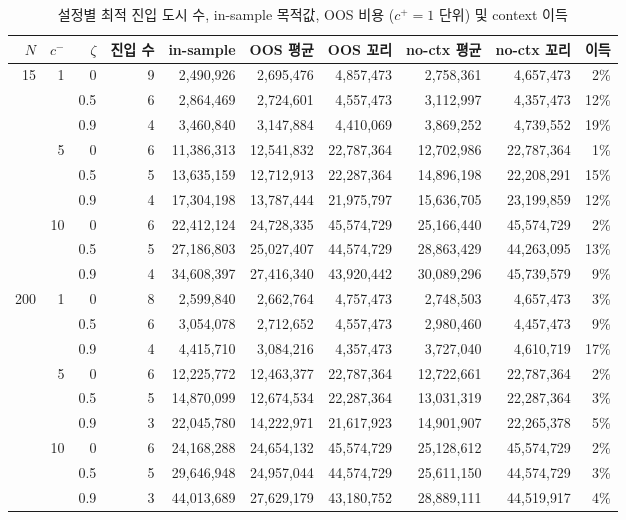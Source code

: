 \documentclass[10pt,a4paper]{article}
\begin{document}
\begin{table}[H]\centering\footnotesize
\caption{설정별 최적 진입 도시 수, in-sample 목적값, OOS 비용 ($c^+=1$ 단위) 및 context 이득}\label{tab:main}
\begin{tabular}{@{}rrr r rrr rr r@{}}
\toprule
$N$ & $c^-$ & $\zeta$ & 진입 수 & in-sample & OOS 평균 & OOS 꼬리 & no-ctx 평균 & no-ctx 꼬리 & 이득 \\ \midrule
15  & 1  & 0   & 9 & 2{,}490{,}926 & 2{,}695{,}476 & 4{,}857{,}473 & 2{,}758{,}361 & 4{,}657{,}473 & 2\% \\
    &    & 0.5 & 6 & 2{,}864{,}469 & 2{,}724{,}601 & 4{,}557{,}473 & 3{,}112{,}997 & 4{,}357{,}473 & 12\% \\
    &    & 0.9 & 4 & 3{,}460{,}840 & 3{,}147{,}884 & 4{,}410{,}069 & 3{,}869{,}252 & 4{,}739{,}552 & 19\% \\
    & 5  & 0   & 6 & 11{,}386{,}313 & 12{,}541{,}832 & 22{,}787{,}364 & 12{,}702{,}986 & 22{,}787{,}364 & 1\% \\
    &    & 0.5 & 5 & 13{,}635{,}159 & 12{,}712{,}913 & 22{,}287{,}364 & 14{,}896{,}198 & 22{,}208{,}291 & 15\% \\
    &    & 0.9 & 4 & 17{,}304{,}198 & 13{,}787{,}444 & 21{,}975{,}797 & 15{,}636{,}705 & 23{,}199{,}859 & 12\% \\
    & 10 & 0   & 6 & 22{,}412{,}124 & 24{,}728{,}335 & 45{,}574{,}729 & 25{,}166{,}440 & 45{,}574{,}729 & 2\% \\
    &    & 0.5 & 5 & 27{,}186{,}803 & 25{,}027{,}407 & 44{,}574{,}729 & 28{,}863{,}429 & 44{,}263{,}095 & 13\% \\
    &    & 0.9 & 4 & 34{,}608{,}397 & 27{,}416{,}340 & 43{,}920{,}442 & 30{,}089{,}296 & 45{,}739{,}579 & 9\% \\ \midrule
200 & 1  & 0   & 8 & 2{,}599{,}840 & 2{,}662{,}764 & 4{,}757{,}473 & 2{,}748{,}503 & 4{,}657{,}473 & 3\% \\
    &    & 0.5 & 6 & 3{,}054{,}078 & 2{,}712{,}652 & 4{,}557{,}473 & 2{,}980{,}460 & 4{,}457{,}473 & 9\% \\
    &    & 0.9 & 4 & 4{,}415{,}710 & 3{,}084{,}216 & 4{,}357{,}473 & 3{,}727{,}040 & 4{,}610{,}719 & 17\% \\
    & 5  & 0   & 6 & 12{,}225{,}772 & 12{,}463{,}377 & 22{,}787{,}364 & 12{,}722{,}661 & 22{,}787{,}364 & 2\% \\
    &    & 0.5 & 5 & 14{,}870{,}099 & 12{,}674{,}534 & 22{,}287{,}364 & 13{,}031{,}319 & 22{,}287{,}364 & 3\% \\
    &    & 0.9 & 3 & 22{,}045{,}780 & 14{,}222{,}971 & 21{,}617{,}923 & 14{,}901{,}907 & 22{,}265{,}378 & 5\% \\
    & 10 & 0   & 6 & 24{,}168{,}288 & 24{,}654{,}132 & 45{,}574{,}729 & 25{,}128{,}612 & 45{,}574{,}729 & 2\% \\
    &    & 0.5 & 5 & 29{,}646{,}948 & 24{,}957{,}044 & 44{,}574{,}729 & 25{,}611{,}150 & 44{,}574{,}729 & 3\% \\
    &    & 0.9 & 3 & 44{,}013{,}689 & 27{,}629{,}179 & 43{,}180{,}752 & 28{,}889{,}111 & 44{,}519{,}917 & 4\% \\
\bottomrule
\end{tabular}
\end{table}
\end{document}
